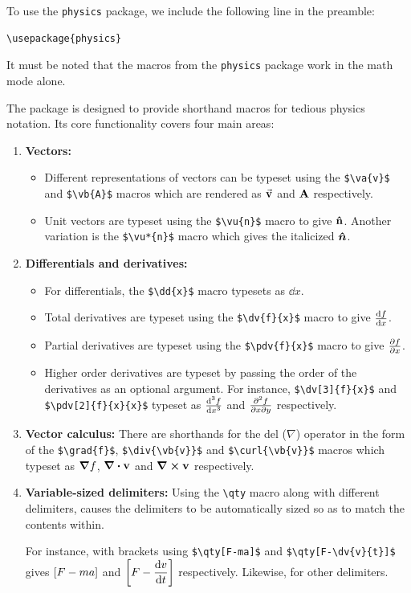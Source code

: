 		To use the \lstinline|physics| package, we include the following line in the preamble:
\begin{lstlisting}
\usepackage{physics}
\end{lstlisting}
		
		It must be noted that the macros from the \lstinline|physics| package work in the math mode alone.

		The package is designed to provide shorthand macros for tedious physics notation. Its core functionality covers four main areas:
		\begin{enumerate}
			\item \textbf{Vectors:}
			\begin{itemize}
				\item Different representations of vectors can be typeset using the \lstinline|$\va{v}$| and \lstinline|$\vb{A}$| macros which are rendered as $\va{v}$ and $\vb{A}$ respectively.
				\item Unit vectors are typeset using the \lstinline|$\vu{n}$| macro to give $\vu{n}$. Another variation is the \lstinline|$\vu*{n}$| macro which gives the italicized $\vu*{n}$.
			\end{itemize}
			\item \textbf{Differentials and derivatives:}
			\begin{itemize}
				\item For differentials, the \lstinline|$\dd{x}$| macro typesets as $\dd{x}$.
				\item Total derivatives are typeset using the \lstinline|$\dv{f}{x}$| macro to give $\dv{f}{x}$.
				\item Partial derivatives are typeset using the \lstinline|$\pdv{f}{x}$| macro to give $\pdv{f}{x}$.
				\item Higher order derivatives are typeset by passing the order of the derivatives as an optional argument. For instance, \lstinline|$\dv[3]{f}{x}$| and \lstinline|$\pdv[2]{f}{x}{x}$| typeset as $\dv[3]{f}{x}$ and $\pdv[2]{f}{x}{y}$ respectively.
			\end{itemize}
			\item \textbf{Vector calculus:} There are shorthands for the del ($\nabla$) operator in the form of the \lstinline|$\grad{f}$|, \lstinline|$\div{\vb{v}}$| and \lstinline|$\curl{\vb{v}}$| macros which typeset as $\grad{f}$, $\div{\vb{v}}$ and $\curl{\vb{v}}$ respectively.
			\item \textbf{Variable-sized delimiters:} Using the \lstinline|\qty| macro along with different delimiters, causes the delimiters to be automatically sized so as to match the contents within.
			
			For instance, with brackets using \lstinline|$\qty[F-ma]$| and \lstinline|$\qty[F-\dv{v}{t}]$| gives $\qty[F-ma]$ and $\displaystyle\qty[F-\dv{v}{t}]$ respectively. Likewise, for other delimiters.
		\end{enumerate}